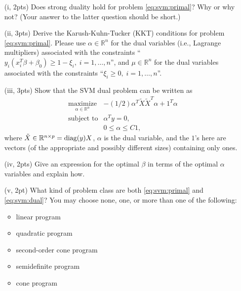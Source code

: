 \documentclass{article}
\theoremstyle{remark}
\theoremstyle{definition}
\newcommand{\maximize}{\mathop{\mathrm{maximize}}}
\newcommand{\maximizewrt}[1]{\underset{#1}{\maximize}}
\newcommand{\subjectto}{\mbox{subject to}}
\newcommand{\ones}{\mathrm 1}
\newcommand{\diag}{\mathop{\rm diag}}
\newcommand{\reals}{\mathbb R}
\begin{document}
\begin{enumerate}
\item[(i, 2pts)] Does strong duality hold for problem \eqref{eq:svm:primal}?  Why or why not?  (Your answer to the latter question should be short.)

\item[(ii, 3pts)] Derive the Karush-Kuhn-Tucker (KKT) conditions for problem \eqref{eq:svm:primal}.  Please use $\alpha \in \reals^n$ for the dual variables (i.e., Lagrange multipliers) associated with the constraints ``$y_i( x_i^T \beta + \beta_0) \geq 1 - \xi_i, \; i=1,\ldots,n$'', and $\mu \in \reals^n$ for the dual variables associated with the constraints ``$\xi_i \geq 0, \; i=1,\ldots,n$''.

\item[(iii, 3pts)] Show that the SVM dual problem can be written as
\begin{equation}
\begin{array}{ll}
\maximizewrt{\alpha \in \reals^n} & -(1/2) \alpha^T \tilde X \tilde X^T \alpha + \ones^T \alpha \\
\subjectto & \alpha^Ty = 0, \\
           & 0 \leq \alpha \leq C \ones,
\end{array}
\label{eq:svm:dual}
\end{equation}
where $\tilde X \in \reals^{n \times p} = \diag(y) X$, $\alpha$ is the dual variable, and the $\ones$'s here are vectors (of the appropriate and possibly different sizes) containing only ones.

\item[(iv, 2pts)] Give an expression for the optimal $\beta$ in terms of the optimal $\alpha$ variables and explain how.

\item[(v, 2pt)] What kind of problem class are both \eqref{eq:svm:primal} and \eqref{eq:svm:dual}?  You may choose none, one, or more than one of the following:
\begin{itemize}
\item linear program
\item quadratic program
\item second-order cone program
\item semidefinite program
\item cone program
\end{itemize}


\end{enumerate}
\end{document}
